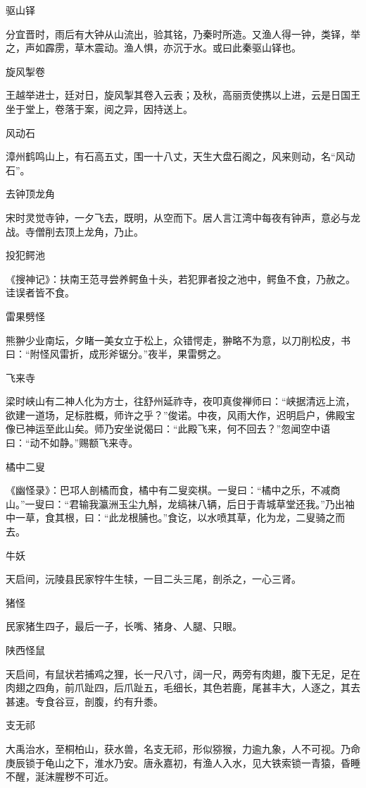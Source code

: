\documentclass[a4paper,12pt,UTF8,twoside]{ctexbook}
\begin{document}
    驱山铎
    
    分宜晋时，雨后有大钟从山流出，验其铭，乃秦时所造。又渔人得一钟，类铎，举之，声如霹雳，草木震动。渔人惧，亦沉于水。或曰此秦驱山铎也。
    
    旋风掣卷
    
    王越举进士，廷对日，旋风掣其卷入云表；及秋，高丽贡使携以上进，云是日国王坐于堂上，卷落于案，阅之异，因持送上。
    
    风动石
    
    漳州鹤鸣山上，有石高五丈，围一十八丈，天生大盘石阁之，风来则动，名“风动石”。
    
    去钟顶龙角
    
    宋时灵觉寺钟，一夕飞去，既明，从空而下。居人言江湾中每夜有钟声，意必与龙战。寺僧削去顶上龙角，乃止。
    
    投犯鳄池
    
    《搜神记》：扶南王范寻尝养鳄鱼十头，若犯罪者投之池中，鳄鱼不食，乃赦之。诖误者皆不食。
    
    雷果劈怪
    
    熊翀少业南坛，夕睹一美女立于松上，众错愕走，翀略不为意，以刀削松皮，书曰：“附怪风雷折，成形斧锯分。”夜半，果雷劈之。
    
    飞来寺
    
    梁时峡山有二神人化为方士，往舒州延祚寺，夜叩真俊禅师曰：“峡据清远上流，欲建一道场，足标胜概，师许之乎？”俊诺。中夜，风雨大作，迟明启户，佛殿宝像已神运至此山矣。师乃安坐说偈曰：“此殿飞来，何不回去？”忽闻空中语曰：“动不如静。”赐额飞来寺。
    
    橘中二叟
    
    《幽怪录》：巴邛人剖橘而食，橘中有二叟奕棋。一叟曰：“橘中之乐，不减商山。”一叟曰：“君输我瀛洲玉尘九斛，龙缟袜八辆，后日于青城草堂还我。”乃出袖中一草，食其根，曰：“此龙根脯也。”食讫，以水喷其草，化为龙，二叟骑之而去。
    
    牛妖
    
    天启间，沅陵县民家牸牛生犊，一目二头三尾，剖杀之，一心三肾。
    
    猪怪
    
    民家猪生四子，最后一子，长嘴、猪身、人腿、只眼。
    
    陕西怪鼠
    
    天启间，有鼠状若捕鸡之狸，长一尺八寸，阔一尺，两旁有肉翅，腹下无足，足在肉翅之四角，前爪趾四，后爪趾五，毛细长，其色若鹿，尾甚丰大，人逐之，其去甚速。专食谷豆，剖腹，约有升黍。
    
    支无祁
    
    大禹治水，至桐柏山，获水兽，名支无祁，形似猕猴，力逾九象，人不可视。乃命庚辰锁于龟山之下，淮水乃安。唐永嘉初，有渔人入水，见大铁索锁一青猿，昏睡不醒，涎沫腥秽不可近。
    
\end{document}
